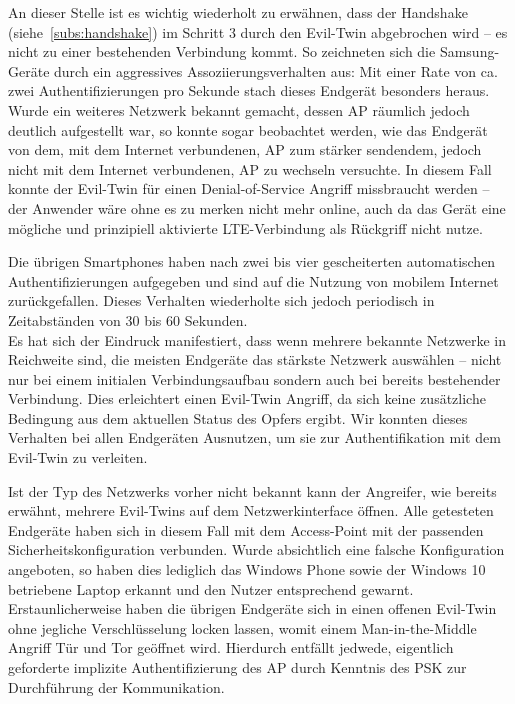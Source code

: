 An dieser Stelle ist es wichtig wiederholt zu erwähnen, dass der Handshake (siehe~\ref{subs:handshake}) im Schritt 3 durch den Evil-Twin abgebrochen wird -- es nicht zu einer bestehenden Verbindung kommt.
So zeichneten sich die Samsung-Geräte durch ein aggressives Assoziierungsverhalten aus: Mit einer Rate von ca. zwei Authentifizierungen pro Sekunde stach dieses Endgerät besonders heraus.
Wurde ein weiteres Netzwerk bekannt gemacht, dessen AP räumlich jedoch deutlich aufgestellt war, so konnte sogar beobachtet werden, wie das Endgerät von dem, mit dem Internet verbundenen, AP zum stärker sendendem, jedoch nicht mit dem Internet verbundenen, AP zu wechseln versuchte. 
In diesem Fall konnte der Evil-Twin für einen Denial-of-Service Angriff missbraucht werden -- der Anwender wäre ohne es zu merken nicht mehr online, auch da das Gerät eine mögliche und prinzipiell aktivierte LTE-Verbindung als Rückgriff nicht nutze.

Die übrigen Smartphones haben nach zwei bis vier gescheiterten automatischen Authentifizierungen aufgegeben und sind auf die Nutzung von mobilem Internet zurückgefallen.
Dieses Verhalten wiederholte sich jedoch periodisch in Zeitabständen von 30 bis 60 Sekunden.\\

Es hat sich der Eindruck manifestiert, dass wenn mehrere bekannte Netzwerke in Reichweite sind, die meisten Endgeräte das stärkste Netzwerk auswählen -- nicht nur bei einem initialen Verbindungsaufbau sondern auch bei bereits bestehender Verbindung. Dies erleichtert einen Evil-Twin Angriff, da sich keine zusätzliche Bedingung aus dem aktuellen Status des Opfers ergibt.
Wir konnten dieses Verhalten bei allen Endgeräten Ausnutzen, um sie zur Authentifikation mit dem Evil-Twin zu verleiten.

Ist der Typ des Netzwerks vorher nicht bekannt kann der Angreifer, wie bereits erwähnt, mehrere Evil-Twins auf dem Netzwerkinterface öffnen.
Alle getesteten Endgeräte haben sich in diesem Fall mit dem Access-Point mit der passenden Sicherheitskonfiguration verbunden.
Wurde absichtlich eine falsche Konfiguration angeboten, so haben dies lediglich das Windows Phone sowie der Windows 10 betriebene Laptop erkannt und den Nutzer entsprechend gewarnt. %
Erstaunlicherweise haben die übrigen Endgeräte sich in einen offenen Evil-Twin ohne jegliche Verschlüsselung locken lassen, womit einem Man-in-the-Middle Angriff Tür und Tor geöffnet wird. Hierdurch entfällt jedwede, eigentlich geforderte implizite Authentifizierung des AP durch Kenntnis des PSK zur Durchführung der Kommunikation.\\

